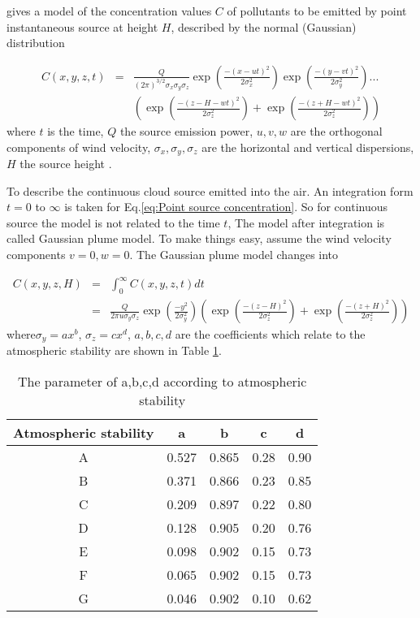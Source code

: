 \cite{N.Kh.2004} gives a model of the concentration values $C$ of
pollutants to be emitted by point instantaneous source at height $H$,
described by the normal (Gaussian) distribution 

\begin{eqnarray}
C(x,y,z,t) & = & \frac{Q}{(2\pi)^{3/2}\sigma_{x}\sigma_{y}\sigma_{z}}\exp\left(\tfrac{-\left(x-ut\right)^{2}}{2\sigma_{x}^{2}}\right)\exp\left(\tfrac{-\left(y-vt\right)^{2}}{2\sigma_{y}^{2}}\right)...\label{eq:Point source concentration}\\
 &  & \left(\exp\left(\tfrac{-\left(z-H-wt\right)^{2}}{2\sigma_{z}^{2}}\right)+\exp\left(\tfrac{-\left(z+H-wt\right)^{2}}{2\sigma_{z}^{2}}\right)\right)
\end{eqnarray}
where $t$ is the time, $Q$ the source emission power, $u,v,w$ are
the orthogonal components of wind velocity, $\sigma_{x},\sigma_{y},\sigma_{z}$
are the horizontal and vertical dispersions, $H$ the source height
. 

To describe the continuous cloud source emitted into the air. An integration
form $t=0$ to $\infty$ is taken for Eq.\ref{eq:Point source concentration}.
So for continuous source the model is not related to the time $t$,
 The model after integration is called Gaussian plume model. To make
things easy, assume the wind velocity components $v=0,w=0$. The Gaussian
plume model changes into

\begin{eqnarray}
C(x,y,z,H) & = & \int_{0}^{\infty}C(x,y,z,t)dt\label{eq:Continous source C}\\
 & = & \frac{Q}{2\pi u\sigma_{y}\sigma_{z}}\exp\left(\tfrac{-y^{2}}{2\sigma_{y}^{2}}\right)\left(\exp\left(\tfrac{-\left(z-H\right)^{2}}{2\sigma_{z}^{2}}\right)+\exp\left(\tfrac{-\left(z+H\right)^{2}}{2\sigma_{z}^{2}}\right)\right)\nonumber 
\end{eqnarray}
where$\sigma_{y}=ax^{b}$, $\sigma_{z}=cx^{d}$, $a,b,c,d$ are the
coefficients which relate to the atmospheric stability are shown in
Table \ref{tab:The-parameter-of}.



\begin{table}
\caption{\label{tab:The-parameter-of}The parameter of a,b,c,d according to
atmospheric stability}
\hfill{}%
\begin{tabular}{|c|c|c|c|c|}
\hline 
Atmospheric stability  & a & b & c & d\tabularnewline
\hline 
\hline 
A & 0.527 & 0.865 & 0.28 & 0.90\tabularnewline
\hline 
B & 0.371 & 0.866 & 0.23 & 0.85\tabularnewline
\hline 
C & 0.209 & 0.897 & 0.22 & 0.80\tabularnewline
\hline 
D & 0.128 & 0.905 & 0.20 & 0.76\tabularnewline
\hline 
E & 0.098 & 0.902 & 0.15 & 0.73\tabularnewline
\hline 
F & 0.065 & 0.902 & 0.15 & 0.73\tabularnewline
\hline 
G & 0.046 & 0.902 & 0.10 & 0.62\tabularnewline
\hline 
\end{tabular}\hfill{}
\end{table}


